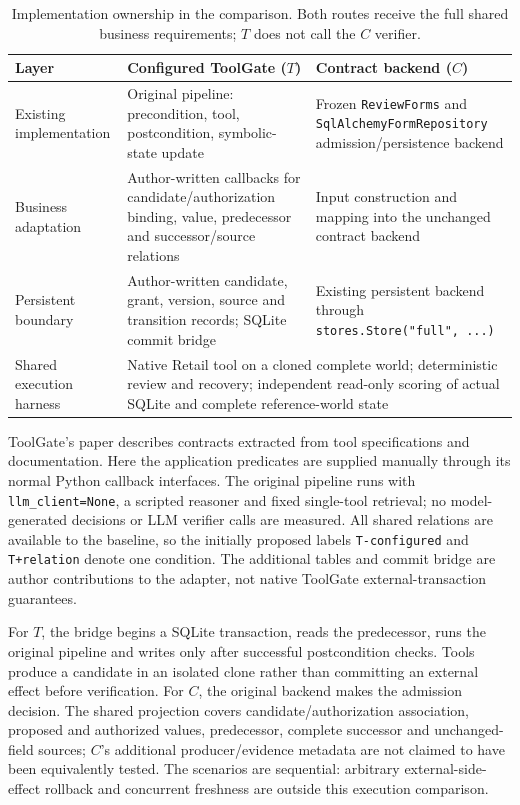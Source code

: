 \documentclass[10pt,a4paper]{article}
\begin{document}
\begin{table}[htbp]
\centering\small
\caption{Implementation ownership in the comparison. Both routes receive the full shared business requirements; $T$ does not call the $C$ verifier.}
\begin{tabularx}{\textwidth}{@{}p{}XX@{}}
\toprule
Layer & Configured ToolGate ($T$) & Contract backend ($C$)\\
\midrule
Existing implementation & Original pipeline: precondition, tool, postcondition, symbolic-state update & Frozen \texttt{ReviewForms} and \texttt{SqlAlchemyFormRepository} admission/persistence backend\\
Business adaptation & Author-written callbacks for candidate/authorization binding, value, predecessor and successor/source relations & Input construction and mapping into the unchanged contract backend\\
Persistent boundary & Author-written candidate, grant, version, source and transition records; SQLite commit bridge & Existing persistent backend through \texttt{stores.Store("full", ...)}\\
Shared execution harness & \multicolumn{2}{p{0.72\textwidth}}{Native Retail tool on a cloned complete world; deterministic review and recovery; independent read-only scoring of actual SQLite and complete reference-world state}\\
\bottomrule
\end{tabularx}
\end{table}

ToolGate's paper describes contracts extracted from tool specifications and documentation. Here the application predicates are supplied manually through its normal Python callback interfaces. The original pipeline runs with \texttt{llm\_client=None}, a scripted reasoner and fixed single-tool retrieval; no model-generated decisions or LLM verifier calls are measured. All shared relations are available to the baseline, so the initially proposed labels \texttt{T-configured} and \texttt{T+relation} denote one condition. The additional tables and commit bridge are author contributions to the adapter, not native ToolGate external-transaction guarantees.

For $T$, the bridge begins a SQLite transaction, reads the predecessor, runs the original pipeline and writes only after successful postcondition checks. Tools produce a candidate in an isolated clone rather than committing an external effect before verification. For $C$, the original backend makes the admission decision. The shared projection covers candidate/authorization association, proposed and authorized values, predecessor, complete successor and unchanged-field sources; $C$'s additional producer/evidence metadata are not claimed to have been equivalently tested. The scenarios are sequential: arbitrary external-side-effect rollback and concurrent freshness are outside this execution comparison.
\end{document}
